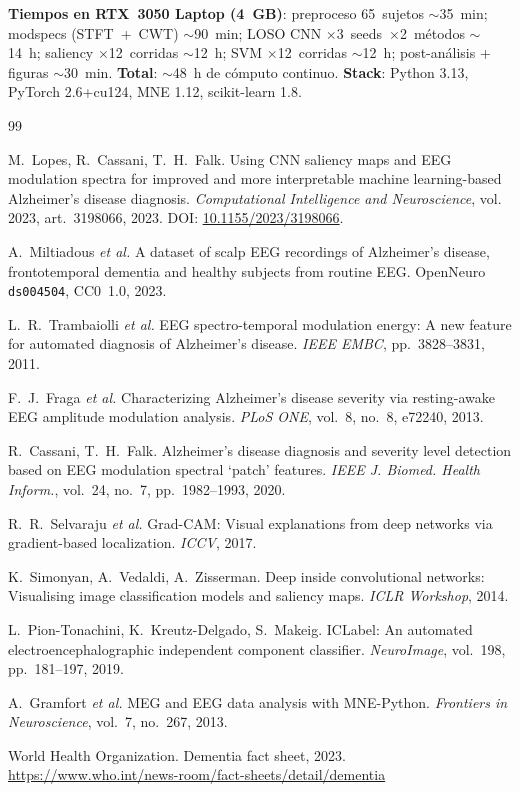 \documentclass[11pt, a4paper]{article}
\begin{document}
\textbf{Tiempos en RTX~3050 Laptop (4~GB)}: preproceso 65~sujetos
$\sim$35~min; modspecs (STFT~+~CWT) $\sim$90~min; LOSO CNN
$\times$3~seeds~$\times$2~métodos $\sim$14~h; saliency $\times$12~corridas
$\sim$12~h; SVM $\times$12~corridas $\sim$12~h; post-análisis + figuras
$\sim$30~min. \textbf{Total}: $\sim$48~h de cómputo continuo.
\textbf{Stack}: Python 3.13, PyTorch 2.6+cu124, MNE 1.12,
scikit-learn 1.8.

\begin{thebibliography}{99}

M.~Lopes, R.~Cassani, T.~H.~Falk.
\newblock Using CNN saliency maps and EEG modulation spectra for
improved and more interpretable machine learning-based Alzheimer's
disease diagnosis.
\newblock \emph{Computational Intelligence and Neuroscience}, vol. 2023,
art.~3198066, 2023. DOI:
\href{https://doi.org/10.1155/2023/3198066}{10.1155/2023/3198066}.

A.~Miltiadous \emph{et al.}
\newblock A dataset of scalp EEG recordings of Alzheimer's disease,
frontotemporal dementia and healthy subjects from routine EEG.
\newblock OpenNeuro \texttt{ds004504}, CC0~1.0, 2023.

L.~R.~Trambaiolli \emph{et al.}
\newblock EEG spectro-temporal modulation energy: A new feature for
automated diagnosis of Alzheimer's disease.
\newblock \emph{IEEE EMBC}, pp.~3828--3831, 2011.

F.~J.~Fraga \emph{et al.}
\newblock Characterizing Alzheimer's disease severity via resting-awake
EEG amplitude modulation analysis.
\newblock \emph{PLoS ONE}, vol.~8, no.~8, e72240, 2013.

R.~Cassani, T.~H.~Falk.
\newblock Alzheimer's disease diagnosis and severity level detection
based on EEG modulation spectral `patch' features.
\newblock \emph{IEEE J. Biomed. Health Inform.}, vol.~24, no.~7,
pp.~1982--1993, 2020.

R.~R.~Selvaraju \emph{et al.}
\newblock Grad-CAM: Visual explanations from deep networks via
gradient-based localization.
\newblock \emph{ICCV}, 2017.

K.~Simonyan, A.~Vedaldi, A.~Zisserman.
\newblock Deep inside convolutional networks: Visualising image
classification models and saliency maps.
\newblock \emph{ICLR Workshop}, 2014.

L.~Pion-Tonachini, K.~Kreutz-Delgado, S.~Makeig.
\newblock ICLabel: An automated electroencephalographic independent
component classifier.
\newblock \emph{NeuroImage}, vol.~198, pp.~181--197, 2019.

A.~Gramfort \emph{et al.}
\newblock MEG and EEG data analysis with MNE-Python.
\newblock \emph{Frontiers in Neuroscience}, vol.~7, no.~267, 2013.

World Health Organization.
\newblock Dementia fact sheet, 2023.
\newblock \url{https://www.who.int/news-room/fact-sheets/detail/dementia}

\end{thebibliography}
\end{document}
